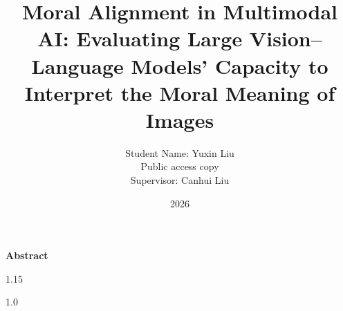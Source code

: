 \documentclass[12pt,a4paper]{report}
\title{
Moral Alignment in Multimodal AI:
Evaluating Large Vision--Language Models’ Capacity to
Interpret the Moral Meaning of Images
}
\author{
    \Large Student Name: Yuxin Liu\\
    \Large Public access copy\\[1cm]
    \Large Supervisor: Canhui Liu
}
\date{2026}
\begin{document}
\hypersetup{pageanchor=false}

\maketitle


\clearpage
{}
\hypersetup{pageanchor=true}

\begin{center}
\textbf{\large Abstract}
\end{center}
\begin{spacing}{1.15}

\end{spacing}

\tableofcontents

\listoffigures
\listoftables



\clearpage
{}












\renewcommand{\bibname}{References}

\begin{spacing}{1.0}
\footnotesize

\end{spacing}


\appendix

\end{document}
